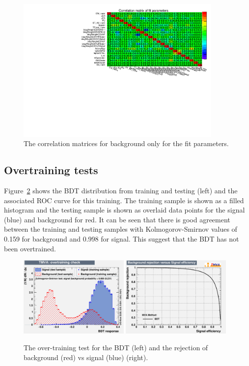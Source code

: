 \begin{figure}[ht!]
    \includegraphics[width=0.9\textwidth]{images/Run2/FitCorr.pdf}
    \caption{The correlation matrices for background only for the fit parameters.}
    \label{fig:FitCorr}
\end{figure}

\subsection{Overtraining tests}

Figure~\ref{fig:ROC} shows the BDT distribution from training and testing (left) and the associated ROC curve for this training. The training sample is shown as a filled histogram and the testing sample is shown as overlaid data points for the signal \tttt (blue) and background \ttbar for red. It can be seen that there is good agreement between the training and testing samples with Kolmogorov-Smirnov values of 0.159 for background and 0.998 for signal. This suggest that the BDT has not been overtrained.

\begin{figure}
    \includegraphics[width=0.48\textwidth]{images/Run2/overtrain_BDT.pdf}
    \includegraphics[width=0.48\textwidth]{images/Run2/rejBvsS.pdf}
    \caption{The over-training test for the BDT (left) and the rejection of background \ttbar (red) vs signal \tttt (blue) (right).}
    \label{fig:ROC}
\end{figure}

